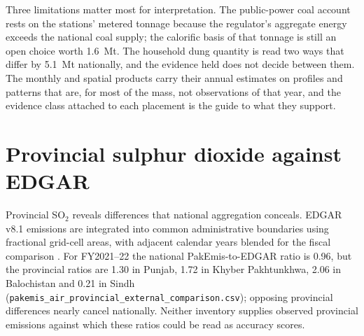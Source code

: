 \documentclass[essd,manuscript]{copernicus}
\begin{document}
Three limitations matter most for interpretation. The public-power coal account rests on the stations' metered tonnage because the regulator's aggregate energy exceeds the national coal supply; the calorific basis of that tonnage is still an open choice worth \SI{1.6}{\mega\tonne}. The household dung quantity is read two ways that differ by \SI{5.1}{\mega\tonne} nationally, and the evidence held does not decide between them. The monthly and spatial products carry their annual estimates on profiles and patterns that are, for most of the mass, not observations of that year, and the evidence class attached to each placement is the guide to what they support.





\ReleaseCover

\appendix
\section{Provincial sulphur dioxide against EDGAR}
\label{app:so2}

Provincial SO$_2$ reveals differences that national aggregation conceals. EDGAR v8.1 emissions are integrated into common administrative boundaries using fractional grid-cell areas, with adjacent calendar years blended for the fiscal comparison \citep{EDGARAP81}. For FY2021--22 the national PakEmis-to-EDGAR ratio is \num{0.96}, but the provincial ratios are \num{1.30} in Punjab, \num{1.72} in Khyber Pakhtunkhwa, \num{2.06} in Balochistan and \num{0.21} in Sindh (\texttt{pakemis\_air\_provincial\_external\_comparison.csv}); opposing provincial differences nearly cancel nationally. Neither inventory supplies observed provincial emissions against which these ratios could be read as accuracy scores.
\end{document}
